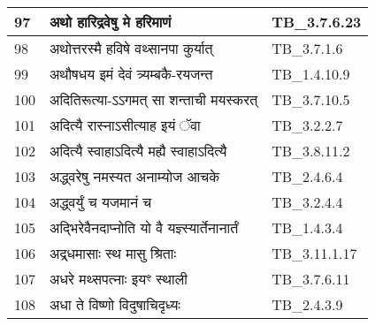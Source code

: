\documentclass[17pt]{extarticle}
\begin{document}
\begin{longtable}{||p{0.4in}||p{4.9in}||p{0.9in}||}
    \hline
        
    97 & अथो हारिद्रवेषु मे हरिमाणं & TB\_3.7.6.23       \\
    
    \hline
        
    98 & अथोत्तरस्मै हविषे वथ्सानपा कुर्यात् & TB\_3.7.1.6       \\
    
    \hline
        
    99 & अथौषधय इमं देवं त्र्यम्बकै{-}रयजन्त & TB\_1.4.10.9       \\
    
    \hline
        
    100 & अदितिरूत्या{-}ऽऽगमत् सा शन्ताची मयस्करत् & TB\_3.7.10.5       \\
    
    \hline
        
    101 & अदित्यै रास्नाऽसीत्याह इयं ॅवा & TB\_3.2.2.7       \\
    
    \hline
        
    102 & अदित्यै स्वाहाऽदित्यै मह्यै स्वाहाऽदित्यै & TB\_3.8.11.2       \\
    
    \hline
        
    103 & अद्ध्वरेषु नमस्यत अनाम्योज आचके & TB\_2.4.6.4       \\
    
    \hline
        
    104 & अद्ध्वर्युं च यजमानं च & TB\_3.2.4.4       \\
    
    \hline
        
    105 & अद्भिरेवैनदाप्नोति यो वै यज्ञ्स्यार्तेनानार्तं & TB\_1.4.3.4       \\
    
    \hline
        
    106 & अद्र्धमासाः स्थ मासु श्रिताः & TB\_3.11.1.17       \\
    
    \hline
        
    107 & अधरे मथ्सपत्नाः इयꣳ स्थाली & TB\_3.7.6.11       \\
    
    \hline
        
    108 & अधा ते विष्णो विदुषाचिदृध्यः & TB\_2.4.3.9       \\
    
    \hline
        

\end{longtable}
\end{document}
